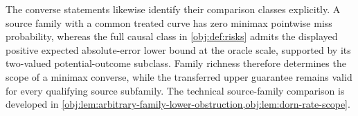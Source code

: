 The converse statements likewise identify their comparison classes explicitly. A source family with a common treated curve has zero minimax pointwise miss probability, whereas the full causal class in \cref{obj:def:risks} admits the displayed positive expected absolute-error lower bound at the oracle scale, supported by its two-valued potential-outcome subclass. Family richness therefore determines the scope of a minimax converse, while the transferred upper guarantee remains valid for every qualifying source subfamily. The technical source-family comparison is developed in \cref{obj:lem:arbitrary-family-lower-obstruction,obj:lem:dorn-rate-scope}.
